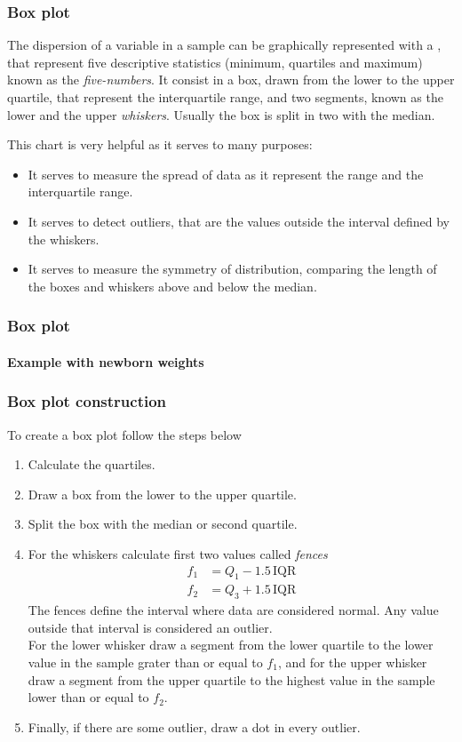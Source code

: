 \begin{frame}
\frametitle{Box plot}
The dispersion of a variable in a sample can be graphically represented with a , that
represent five descriptive statistics (minimum, quartiles and maximum) known as the \emph{five-numbers}.
It consist in a box, drawn from the lower to the upper quartile, that represent the interquartile range, and two
segments, known as the lower and the upper \emph{whiskers}.  
Usually the box is split in two with the median. 

This chart is very helpful as it serves to many purposes:  
\begin{itemize}
\item It serves to measure the spread of data as it represent the range and the interquartile range. 
\item It serves to detect outliers, that are the values outside the interval defined by the whiskers.
\item It serves to measure the symmetry of distribution, comparing the length of the boxes and whiskers above and below
the median. 
\end{itemize}
\end{frame}


\begin{frame}
\frametitle{Box plot}
\framesubtitle{Example with newborn weights}
\begin{center}
\scalebox{0.6}{}
\end{center}
\end{frame}


\begin{frame}
\frametitle{Box plot construction}
To create a box plot follow the steps below
\begin{enumerate}
\item Calculate the quartiles. 
\item Draw a box from the lower to the upper quartile. 
\item Split the box with the median or second quartile. 
\item For the whiskers calculate first two values called \emph{fences}
\begin{align*}
f_1&=Q_1-1.5\,\text{IQR}\\
f_2&=Q_3+1.5\,\text{IQR}
\end{align*}
The fences define the interval where data are considered normal.
Any value outside that interval is considered an outlier. \\ 
For the lower whisker draw a segment from the lower quartile to the lower value in the sample grater than or
equal to $f_1$, and for the upper whisker draw a segment from the upper quartile to the highest value in the sample lower than
or equal to $f_2$.
\item Finally, if there are some outlier, draw a dot in every outlier. 
\end{enumerate}
\end{frame}


